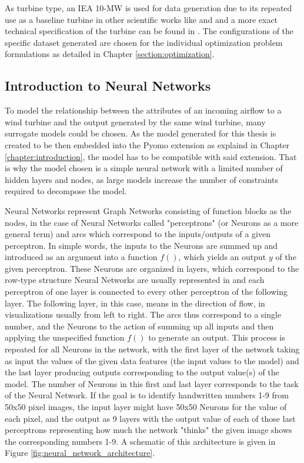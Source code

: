 \documentclass[preprint,12pt]{elsarticle}
\begin{document}
 As turbine type, an IEA 10-MW is used for data generation due to its repeated use as a baseline turbine in other scientific works like \cite{Madsen2022} and \cite{Kainz2024IEA} and a more exact technical specification of the turbine can be found in \cite{Bortolotti2019}. The configurations of the specific dataset generated are chosen for the individual optimization problem formulations as detailed in Chapter \ref{section:optimization}.


\subsection{Introduction to Neural Networks} \label{sec:modelling}

To model the relationship between the attributes of an incoming airflow to a wind turbine and the output generated by the same wind turbine, many surrogate models could be chosen. As the model generated for this thesis is created to be then embedded into the Pyomo extension as explaind in Chapter \ref{chapter:introduction}, the model has to be compatible with said extension. That is why the model chosen is a simple neural network with a limited number of hidden layers and nodes, as large models increase the number of constraints required to decompose the model. 

Neural Networks represent Graph Networks consisting of function blocks as the nodes, in the case of Neural Networks called "perceptrons" (or Neurons as a more general term) and arcs which correspond to the inputs/outputs of a given perceptron. In simple words, the inputs to the Neurons are summed up and introduced as an argument into a function $f()$, which yields an output $y$ of the given perceptron. These Neurons are organized in layers, which correspond to the row-type structure Neural Networks are usually represented in and each perceptron of one layer is connected to every other perceptron of the following layer. The following layer, in this case, means in the direction of flow, in visualizations usually from left to right. The arcs thus correspond to a single number, and the Neurons to the action of summing up all inputs and then applying the unspecified function $f()$ to generate an output. This process is repeated for all Neurons in the network, with the first layer of the network taking as input the values of the given data features (the input values to the model) and the last layer producing outputs corresponding to the output value(s) of the model. The number of Neurons in this first and last layer corresponds to the task of the Neural Network. If the goal is to identify handwritten numbers 1-9 from 50x50 pixel images, the input layer might have 50x50 Neurons for the value of each pixel, and the output as 9 layers with the output value of each of those last perceptrons representing how much the network "thinks" the given image shows the corresponding numbers 1-9. A schematic of this architecture is given in Figure \ref{fig:neural_network_architecture}.
\end{document}
